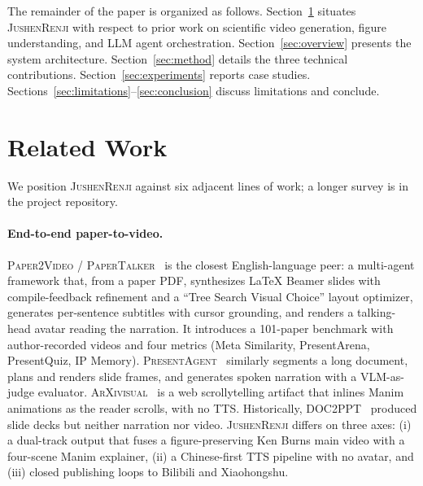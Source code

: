 \documentclass[11pt,a4paper]{article}
\begin{document}
The remainder of the paper is organized as follows. Section~\ref{sec:related} situates \textsc{JushenRenji} with respect to prior work on scientific video generation, figure understanding, and LLM agent orchestration. Section~\ref{sec:overview} presents the system architecture. Section~\ref{sec:method} details the three technical contributions. Section~\ref{sec:experiments} reports case studies. Sections~\ref{sec:limitations}--\ref{sec:conclusion} discuss limitations and conclude.

\section{Related Work}
\label{sec:related}

We position \textsc{JushenRenji} against six adjacent lines of work; a longer survey is in the project repository.

\paragraph{End-to-end paper-to-video.}
\textsc{Paper2Video} / \textsc{PaperTalker}~\citep{zhu2025paper2video} is the closest English-language peer: a multi-agent framework that, from a paper PDF, synthesizes LaTeX Beamer slides with compile-feedback refinement and a ``Tree Search Visual Choice'' layout optimizer, generates per-sentence subtitles with cursor grounding, and renders a talking-head avatar reading the narration. It introduces a 101-paper benchmark with author-recorded videos and four metrics (Meta Similarity, PresentArena, PresentQuiz, IP Memory). \textsc{PresentAgent}~\citep{shi2025presentagent} similarly segments a long document, plans and renders slide frames, and generates spoken narration with a VLM-as-judge evaluator. \textsc{ArXivisual}~\citep{shah2026arxivisual} is a web scrollytelling artifact that inlines Manim animations as the reader scrolls, with no TTS. Historically, DOC2PPT~\citep{fu2022doc2ppt} produced slide decks but neither narration nor video. \textsc{JushenRenji} differs on three axes: (i) a dual-track output that fuses a figure-preserving Ken Burns main video with a four-scene Manim explainer, (ii) a Chinese-first TTS pipeline with no avatar, and (iii) closed publishing loops to Bilibili and Xiaohongshu.
\end{document}
